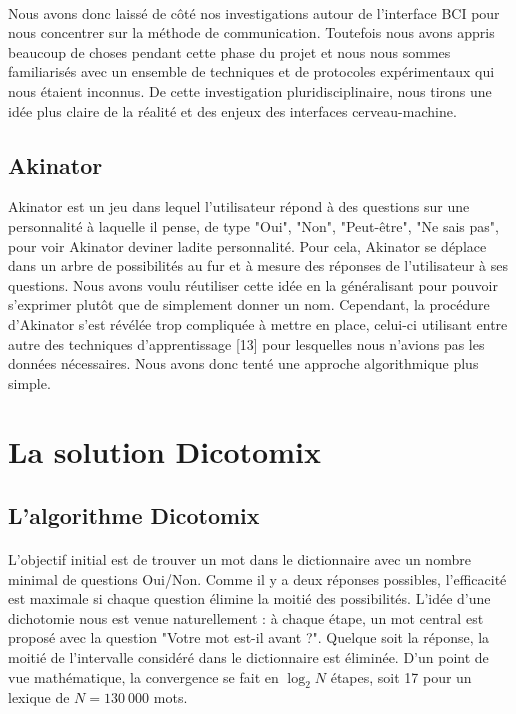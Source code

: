 \documentclass[11pt,a4paper]{article}
\theoremstyle{plain}
\theoremstyle{definition}
\begin{document}
\paragraph{} Nous avons donc laissé de côté nos investigations autour de l'interface BCI pour nous concentrer sur la méthode de communication. Toutefois nous avons appris beaucoup de choses pendant cette phase du projet et nous nous sommes familiarisés avec un ensemble de techniques et de protocoles expérimentaux qui nous étaient inconnus. De cette investigation pluridisciplinaire, nous tirons une idée plus claire de la réalité et des enjeux des interfaces cerveau-machine.

\subsection{Akinator}

Akinator est un jeu dans lequel l'utilisateur répond à des questions sur une personnalité à laquelle il pense, de type "Oui", "Non", "Peut-être", "Ne sais pas", pour voir Akinator deviner ladite personnalité. Pour cela, Akinator se déplace dans un arbre de possibilités au fur et à mesure des réponses de l'utilisateur à ses questions. Nous avons voulu réutiliser cette idée en la généralisant pour pouvoir s'exprimer plutôt que de simplement donner un nom. Cependant, la procédure d'Akinator s'est révélée trop compliquée à mettre en place, celui-ci utilisant entre autre des techniques d'apprentissage [13] pour lesquelles nous n'avions pas les données nécessaires. Nous avons donc tenté une approche algorithmique plus simple.

\section{La solution Dicotomix}
 
\subsection{L'algorithme Dicotomix}
\paragraph{} L'objectif initial est de trouver un mot dans le dictionnaire avec un nombre minimal de questions Oui/Non. Comme il y a deux réponses possibles, l'efficacité est maximale si chaque question élimine la moitié des possibilités. L'idée d'une dichotomie nous est venue naturellement : à chaque étape, un mot central est proposé avec la question "Votre mot est-il avant ?". Quelque soit la réponse, la moitié de l'intervalle considéré dans le dictionnaire est éliminée. D'un point de vue mathématique, la convergence se fait en $\log_2N$ étapes, soit 17 pour un lexique de $N=130\ 000$ mots.
\end{document}
